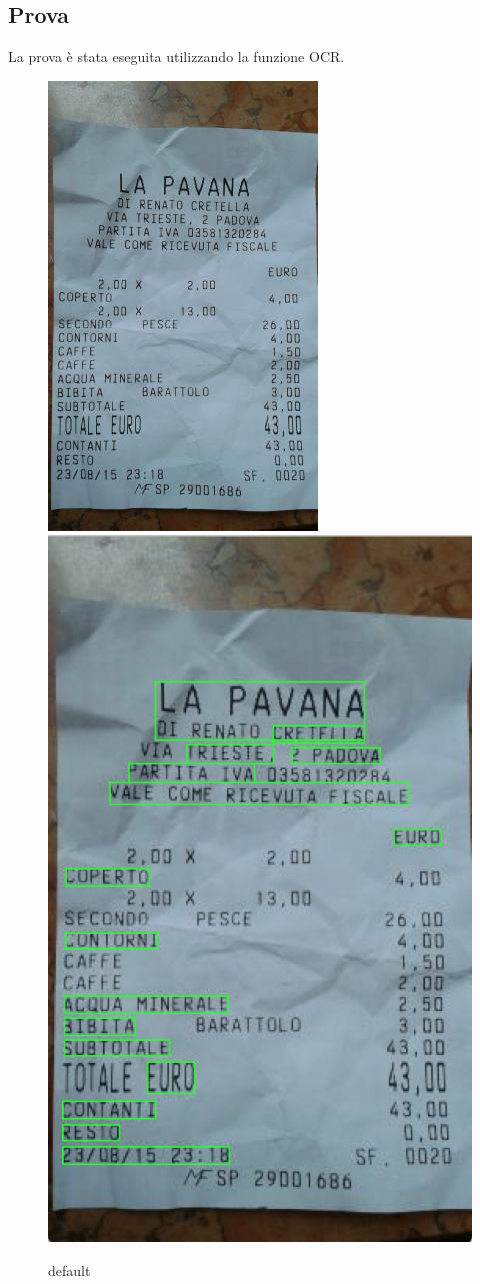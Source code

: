 \documentclass[fleqn,a4paper,11pt]{report}
\begin{document}
\subsection{Prova}
La prova è stata eseguita utilizzando la funzione OCR.
\begin{figure}[htbp]
\begin{center}
	\includegraphics[height=.5\textwidth]{img/scontrino.jpg}
  	\hspace*{1in}
	\includegraphics[height=.5\textwidth]{img/ms-ocr.png}
\caption{default}
\label{default}
\end{center}
\end{figure}





%
\end{document}
